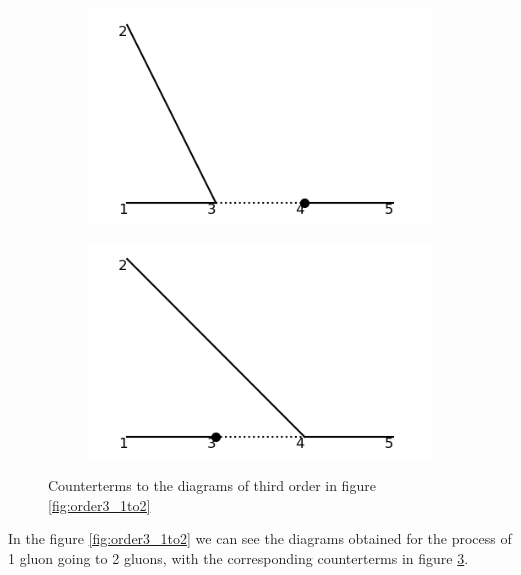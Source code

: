 \documentclass[11pt,a4paper,twoside,pdf]{article}
\numberwithin{equation}{section}
\begin{document}
\begin{figure}[h!]
\begin{subfigure}[t]{0.24\textwidth}
        \caption{ }
    \end{subfigure}
    \hfill
    \begin{subfigure}[t]{0.24\textwidth}
        \centering
        \includegraphics[width=\textwidth]{plots/order3/order3_1to2/counterterms/4.png}
        \caption{ }
        \label{fig:order3_1to2/counterterms/4}
    \end{subfigure}
    \hfill
    \begin{subfigure}[t]{0.24\textwidth}
        \centering
        \includegraphics[width=\textwidth]{plots/order3/order3_1to2/counterterms/5.png}
        \caption{ }
        \label{fig:order3_1to2/counterterms/5}
    \end{subfigure}
    \caption{Counterterms to the diagrams of third order in figure \ref{fig:order3_1to2}}
    \label{fig:order3_1to2/counterterms}
\end{figure}


In the figure \ref{fig:order3_1to2} we can see the diagrams obtained for the process
of 1 gluon going to 2 gluons, with the corresponding counterterms in figure
\ref{fig:order3_1to2/counterterms}. 
\end{document}
